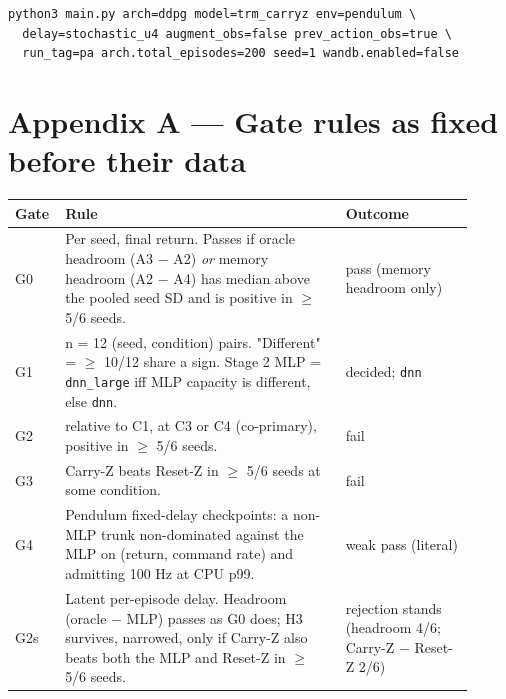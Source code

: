 \documentclass[11pt]{article}
\begin{document}
{\small\begin{verbatim}
python3 main.py arch=ddpg model=trm_carryz env=pendulum \
  delay=stochastic_u4 augment_obs=false prev_action_obs=true \
  run_tag=pa arch.total_episodes=200 seed=1 wandb.enabled=false
\end{verbatim}}



\medskip



\section*{Appendix A --- Gate rules as fixed before their data}



\begin{center}\small\begin{tabular}{>{\raggedright\arraybackslash}p{0.063\linewidth}>{\raggedright\arraybackslash}p{0.580\linewidth}>{\raggedright\arraybackslash}p{0.263\linewidth}}
\toprule
Gate & Rule & Outcome \\
\midrule
G0 & Per seed, final return. Passes if oracle headroom (A3 $-$ A2) \emph{or} memory headroom (A2 $-$ A4) has median above the pooled seed SD and is positive in $\geq$ 5/6 seeds. & pass (memory headroom only) \\
G1 & n = 12 (seed, condition) pairs. "Different" = $\geq$ 10/12 share a sign. Stage 2 MLP = \texttt{dnn\_large} iff MLP capacity is different, else \texttt{dnn}. & decided; \texttt{dnn} \\
G2 & [Carry-Z $-$ MLP] relative to C1, at C3 or C4 (co-primary), positive in $\geq$ 5/6 seeds. & fail \\
G3 & Carry-Z beats Reset-Z in $\geq$ 5/6 seeds at some condition. & fail \\
G4 & Pendulum fixed-delay checkpoints: a non-MLP trunk non-dominated against the MLP on (return, command rate) and admitting 100 Hz at CPU p99. & weak pass (literal) \\
G2s & Latent per-episode delay. Headroom (oracle $-$ MLP) passes as G0 does; H3 survives, narrowed, only if Carry-Z also beats both the MLP and Reset-Z in $\geq$ 5/6 seeds. & rejection stands (headroom 4/6; Carry-Z $-$ Reset-Z 2/6) \\
\bottomrule
\end{tabular}\end{center}
\end{document}

